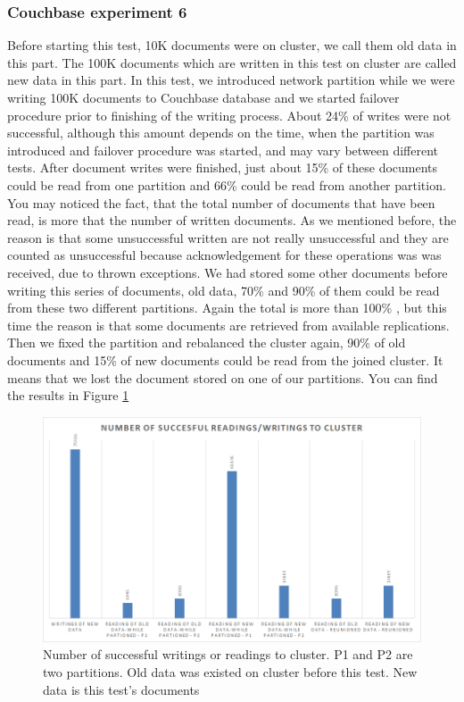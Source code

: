 \documentclass[a4paper]{article}
\begin{document}
\subsubsection{Couchbase experiment 6}
Before starting this test, 10K documents were on cluster, we call them old data in this part.
The 100K documents which are written in this test on cluster are called new data in this part. 
In this test, we introduced network partition while we were writing 100K documents to Couchbase database and we started failover procedure prior to finishing of the writing process. 
About 24\% of writes were not successful, although this amount depends on the time, when the partition was introduced and failover procedure was started, and may vary between different tests.
After document writes were finished, just about 15\% of these documents could be read from one partition and 66\% could be read from another partition.
You may noticed the fact, that the total number of documents that have been read, is more that the number of written documents.
As we mentioned before, the reason is that some unsuccessful written are not really unsuccessful and they are counted as unsuccessful because acknowledgement for these operations was was received, due to thrown exceptions. 
We had stored some other documents before writing this series of documents, old data, 70\% and 90\% of them could be read from these two different partitions.
Again the total is more than 100\% , but this time the reason is that some documents are retrieved from available replications. 
Then we fixed the partition and rebalanced the cluster again, 90\% of old documents and 15\% of new documents could be read from the joined cluster.
It means that we lost the document stored on one of our partitions.
You can find the results in Figure \ref{fig:diagram7}
\begin{figure}[h!]
	\centering
	\includegraphics[width=\textwidth]{diagram7}
	\caption{Number of successful writings or readings to cluster. P1 and P2 are two partitions. Old data was existed on cluster before this test. New data is this test's documents}
	\label{fig:diagram7}
\end{figure}
\end{document}
